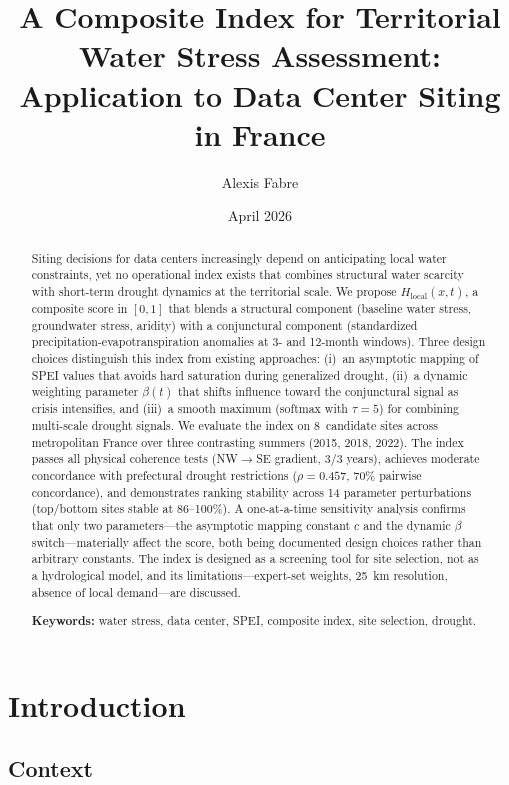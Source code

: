 \documentclass[11pt,a4paper]{article}
\title{A Composite Index for Territorial Water Stress Assessment:\\
Application to Data Center Siting in France}
\author{Alexis Fabre}
\affil{Olara, Paris, France \\ \texttt{alexis.fabre@cegedim.com}}
\date{April 2026}
\begin{document}
\maketitle

\begin{abstract}
Siting decisions for data centers increasingly depend on anticipating local water constraints, yet no operational index exists that combines structural water scarcity with short-term drought dynamics at the territorial scale. We propose $H_{\text{local}}(x,t)$, a composite score in $[0,1]$ that blends a structural component (baseline water stress, groundwater stress, aridity) with a conjunctural component (standardized precipitation-evapotranspiration anomalies at 3- and 12-month windows). Three design choices distinguish this index from existing approaches: (i)~an asymptotic mapping of SPEI values that avoids hard saturation during generalized drought, (ii)~a dynamic weighting parameter $\beta(t)$ that shifts influence toward the conjunctural signal as crisis intensifies, and (iii)~a smooth maximum (softmax with $\tau=5$) for combining multi-scale drought signals. We evaluate the index on 8~candidate sites across metropolitan France over three contrasting summers (2015, 2018, 2022). The index passes all physical coherence tests (NW$\to$SE gradient, 3/3 years), achieves moderate concordance with prefectural drought restrictions ($\rho=0.457$, 70\% pairwise concordance), and demonstrates ranking stability across 14 parameter perturbations (top/bottom sites stable at 86--100\%). A one-at-a-time sensitivity analysis confirms that only two parameters---the asymptotic mapping constant $c$ and the dynamic $\beta$ switch---materially affect the score, both being documented design choices rather than arbitrary constants. The index is designed as a screening tool for site selection, not as a hydrological model, and its limitations---expert-set weights, 25~km resolution, absence of local demand---are discussed.

\vspace{0.5em}
\noindent\textbf{Keywords:} water stress, data center, SPEI, composite index, site selection, drought.
\end{abstract}

\section{Introduction}

\subsection{Context}
\end{document}
